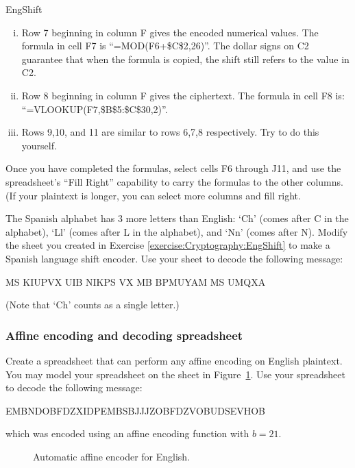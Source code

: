 \begin{exercise}{EngShift}
\begin{enumerate}[(i)]
\begin{itemize}
\end{itemize}
\item
Row 7 beginning in column F gives the encoded numerical values. The formula in cell F7 is ``=MOD(F6+\$C\$2,26)''.  The dollar signs on C2 guarantee that when the formula is copied, the shift still refers to the value in C2.
\item
Row 8 beginning in column F gives the ciphertext.  The formula in cell F8 is: ``=VLOOKUP(F7,\$B\$5:\$C\$30,2)''. 
\item
Rows 9,10, and 11 are similar to rows 6,7,8 respectively. Try to do this yourself. 
\end{enumerate}
Once you have completed the formulas, select cells F6 through J11, and use the spreadsheet's ``Fill Right'' capability to carry the formulas to the other columns.  (If your plaintext is longer, you can select more columns and fill right.
\end{exercise}

\begin{exercise}{}
The Spanish alphabet has 3 more letters than English:  `Ch' (comes after C in the alphabet), `Ll'  (comes after L in the alphabet), and `Nn' (comes after N).  Modify the sheet you created in Exercise \ref{exercise:Cryptography:EngShift} to make a Spanish language shift encoder.  Use your sheet to decode the following message:

MS KIUPVX	UIB NIKPS VX MB BPMUYAM MS UMQXA

(Note that `Ch' counts as a single letter.)
\end{exercise}

\subsubsection*{Affine encoding and decoding spreadsheet
\quad
{}}
\label{sec:Cryptography:PrivateKey:AffineCodeDecodeSpreadsheet}

\begin{exercise}{}
Create a spreadsheet that can perform any affine encoding on English plaintext.  You may model your spreadsheet on the sheet in Figure~\ref{fig:affine}.  Use your spreadsheet to decode the following message:


EMBNDOBFDZXIDPEMBSBJJJZOBFDZVOBUDSEVHOB

which was encoded using an affine encoding function with $b=21$.
\begin{figure}[h]
\caption{Automatic affine encoder for English.}
\label{fig:affine}
\end{figure}
\end{exercise}

